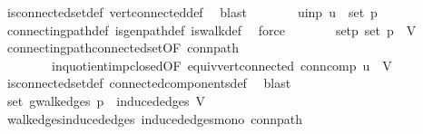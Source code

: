 \begin{isabellebody}
\ is{\isacharunderscore}{\kern0pt}connected{\isacharunderscore}{\kern0pt}set{\isacharunderscore}{\kern0pt}def\ vert{\isacharunderscore}{\kern0pt}connected{\isacharunderscore}{\kern0pt}def\ \isamarkupfalse%
\ blast\isanewline
\ \ \ \ \isamarkupfalse%
\ \isamarkupfalse%
\ u{\isacharunderscore}{\kern0pt}in{\isacharunderscore}{\kern0pt}p{\isacharcolon}{\kern0pt}\ {\isachardoublequoteopen}u\ {\isasymin}\ set\ p{\isachardoublequoteclose}\ \isamarkupfalse%
\ connecting{\isacharunderscore}{\kern0pt}path{\isacharunderscore}{\kern0pt}def\ is{\isacharunderscore}{\kern0pt}gen{\isacharunderscore}{\kern0pt}path{\isacharunderscore}{\kern0pt}def\ is{\isacharunderscore}{\kern0pt}walk{\isacharunderscore}{\kern0pt}def\ \isamarkupfalse%
\ force\isanewline
\ \ \ \ \isamarkupfalse%
\ \isamarkupfalse%
\ set{\isacharunderscore}{\kern0pt}p{\isacharcolon}{\kern0pt}\ {\isachardoublequoteopen}set\ p\ {\isasymsubseteq}\ V{\isacharprime}{\kern0pt}{\isachardoublequoteclose}\ \isamarkupfalse%
\ connecting{\isacharunderscore}{\kern0pt}path{\isacharunderscore}{\kern0pt}connected{\isacharunderscore}{\kern0pt}set{\isacharbrackleft}{\kern0pt}OF\ conn{\isacharunderscore}{\kern0pt}path{\isacharbrackright}{\kern0pt}\isanewline
\ \ \ \ \ \ \ \ in{\isacharunderscore}{\kern0pt}quotient{\isacharunderscore}{\kern0pt}imp{\isacharunderscore}{\kern0pt}closed{\isacharbrackleft}{\kern0pt}OF\ equiv{\isacharunderscore}{\kern0pt}vert{\isacharunderscore}{\kern0pt}connected{\isacharbrackright}{\kern0pt}\ conn{\isacharunderscore}{\kern0pt}comp\ {\isacartoucheopen}u\ {\isasymin}\ V{\isacharprime}{\kern0pt}{\isacartoucheclose}\isanewline
\ \ \ \ \ \ \isamarkupfalse%
\ is{\isacharunderscore}{\kern0pt}connected{\isacharunderscore}{\kern0pt}set{\isacharunderscore}{\kern0pt}def\ connected{\isacharunderscore}{\kern0pt}components{\isacharunderscore}{\kern0pt}def\ \isamarkupfalse%
\ blast\isanewline
\ \ \ \ \isamarkupfalse%
\ \isamarkupfalse%
\ {\isachardoublequoteopen}set\ {\isacharparenleft}{\kern0pt}g{\isacharprime}{\kern0pt}{\isachardot}{\kern0pt}walk{\isacharunderscore}{\kern0pt}edges\ p{\isacharparenright}{\kern0pt}\ {\isasymsubseteq}\ induced{\isacharunderscore}{\kern0pt}edges\ V{\isacharprime}{\kern0pt}{\isachardoublequoteclose}\isanewline
\ \ \ \ \ \ \isamarkupfalse%
\ walk{\isacharunderscore}{\kern0pt}edges{\isacharunderscore}{\kern0pt}induced{\isacharunderscore}{\kern0pt}edges\ induced{\isacharunderscore}{\kern0pt}edges{\isacharunderscore}{\kern0pt}mono\ conn{\isacharunderscore}{\kern0pt}path\ \isamarkupfalse%

\end{isabellebody}
